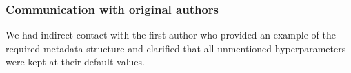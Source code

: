 \subsubsection*{Communication with original authors}

We had indirect contact with the first author who provided an example of the required metadata structure and clarified that all unmentioned hyperparameters were kept at their default values.
